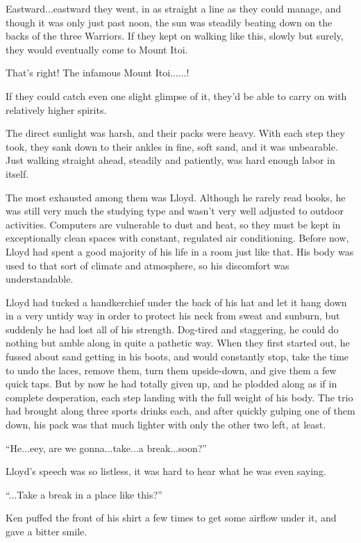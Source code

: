 \documentclass[
]{article}
\begin{document}
Eastward...eastward they went, in as straight a line as they could
manage, and though it was only just past noon, the sun was steadily
beating down on the backs of the three Warriors. If they kept on walking
like this, slowly but surely, they would eventually come to Mount Itoi.

That's right! The infamous Mount Itoi......!

If they could catch even one slight glimpse of it, they'd be able to
carry on with relatively higher spirits.

The direct sunlight was harsh, and their packs were heavy. With each
step they took, they sank down to their ankles in fine, soft sand, and
it was unbearable. Just walking straight ahead, steadily and patiently,
was hard enough labor in itself.

The most exhausted among them was Lloyd. Although he rarely read books,
he was still very much the studying type and wasn't very well adjusted
to outdoor activities. Computers are vulnerable to dust and heat, so
they must be kept in exceptionally clean spaces with constant, regulated
air conditioning. Before now, Lloyd had spent a good majority of his
life in a room just like that. His body was used to that sort of climate
and atmosphere, so his discomfort was understandable.

Lloyd had tucked a handkerchief under the back of his hat and let it
hang down in a very untidy way in order to protect his neck from sweat
and sunburn, but suddenly he had lost all of his strength. Dog-tired and
staggering, he could do nothing but amble along in quite a pathetic way.
When they first started out, he fussed about sand getting in his boots,
and would constantly stop, take the time to undo the laces, remove them,
turn them upside-down, and give them a few quick taps. But by now he had
totally given up, and he plodded along as if in complete desperation,
each step landing with the full weight of his body. The trio had brought
along three sports drinks each, and after quickly gulping one of them
down, his pack was that much lighter with only the other two left, at
least.

``He...eey, are we gonna...take...a break...soon?''

Lloyd's speech was so listless, it was hard to hear what he was even
saying.

``...Take a break in a place like this?''

Ken puffed the front of his shirt a few times to get some airflow under
it, and gave a bitter smile.
\end{document}

